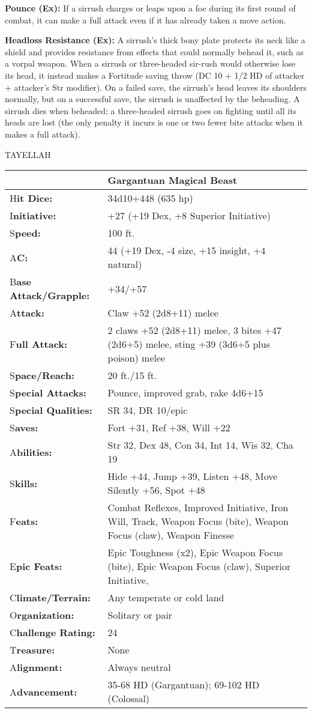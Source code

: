 \documentclass{article}
\begin{document}
{\textbf{Pounce (Ex):} If a sirrush charges or leaps upon a foe during its first 
round of combat, it can make a full attack even if it has already taken a move 
action. 

\textbf{Headloss Resistance (Ex):} A sirrush's thick bony plate protects its neck 
like a shield and provides resistance from effects that could normally behead it, 
such as a vorpal weapon. When a sirrush or three-headed sir-rush would otherwise 
lose its head, it instead makes a Fortitude saving throw (DC 10 + 1/2 HD of attacker 
+ attacker's Str modifier). On a failed save, the sirrush's head leaves its shoulders 
normally, but on a successful save, the sirrush is unaffected by the beheading. 
A sirrush dies when beheaded; a three-headed sirrush goes on fighting until all 
its heads are lost (the only penalty it incurs is one or two fewer bite attacks 
when it makes a full attack). 

\vspace{12pt}
{\LARGE{}TAYELLAH }

\begin{tabular}{|>{\raggedright}p{66pt}|>{\raggedright}p{259pt}|}
\hline
  & Gargantuan Magical Beast \tabularnewline
\hline
H\textbf{it Dice:} & 34d10+448 (635 hp) \tabularnewline
\hline
I\textbf{nitiative:} & +27 (+19 Dex, +8 Superior Initiative) \tabularnewline
\hline
S\textbf{peed:} & 100 ft. \tabularnewline
\hline
A\textbf{C:} & 44 (+19 Dex, -4 size, +15 insight, +4 natural) \tabularnewline
\hline
B\textbf{ase Attack/Grapple:} & +34/+57\tabularnewline
\hline
A\textbf{ttack:} & Claw +52 (2d8+11) melee\tabularnewline
\hline
F\textbf{ull Attack:} & 2 claws +52 (2d8+11) melee, 3 bites +47 (2d6+5) melee, 
sting +39 (3d6+5 plus poison) melee\textbf{ }\tabularnewline
\hline
S\textbf{pace/Reach:} & 20 ft./15 ft. \tabularnewline
\hline
S\textbf{pecial Attacks:} & Pounce, improved grab, rake 4d6+15 \tabularnewline
\hline
S\textbf{pecial Qualities:} & SR 34, DR 10/epic \tabularnewline
\hline
S\textbf{aves:} & Fort +31, Ref +38, Will +22 \tabularnewline
\hline
A\textbf{bilities:} & Str 32, Dex 48, Con 34, Int 14, Wis 32, Cha 19 \tabularnewline
\hline
S\textbf{kills:} & Hide +44, Jump +39, Listen +48, Move Silently +56, Spot +48\tabularnewline
\hline
F\textbf{eats:} & Combat Reflexes, Improved Initiative, Iron Will, Track, Weapon 
Focus (bite), Weapon Focus (claw), Weapon Finesse\tabularnewline
\hline
E\textbf{pic Feats:} & Epic Toughness (x2), Epic Weapon Focus (bite), Epic Weapon 
Focus (claw), Superior Initiative,\tabularnewline
\hline
C\textbf{limate/Terrain:} & Any temperate or cold land \tabularnewline
\hline
O\textbf{rganization:} & Solitary or pair \tabularnewline
\hline
C\textbf{hallenge Rating:} & 24 \tabularnewline
\hline
T\textbf{reasure:} & None \tabularnewline
\hline
A\textbf{lignment:} & Always neutral \tabularnewline
\hline
A\textbf{dvancement:} & 35-68 HD (Gargantuan); 69-102 HD (Colossal) \tabularnewline
\hline
\end{tabular}

}
\end{document}
